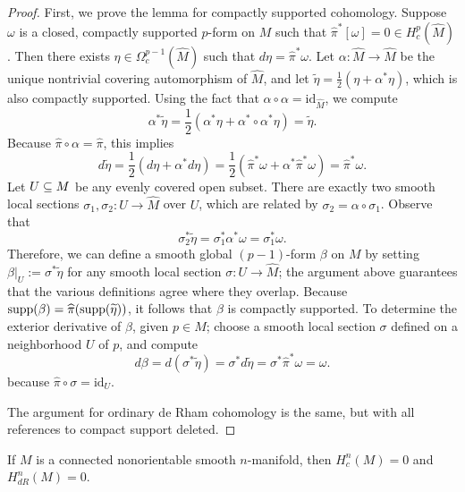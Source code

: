 \begin{proof}
First, we prove the lemma for compactly supported cohomology. Suppose $\omega$ is a closed, compactly supported $p$-form on $M$ such that $\widehat{\pi}^*[\omega]=0\in H^p_c(\widehat{M})$. Then there exists $\eta\in\Omega^{p-1}_c(\widehat{M})$ such that $d\eta=\widehat{\pi}^*\omega$. Let $\alpha:\widehat{M}\to\widehat{M}$ be the unique nontrivial covering automorphism of $\widehat{M}$, and let $\widetilde{\eta}=\frac{1}{2}(\eta+\alpha^*\eta)$, which is also compactly supported. Using the fact that $\alpha\circ\alpha=\mathrm{id}_{\widehat{M}}$, we compute
\[\alpha^*\widetilde{\eta}=\frac{1}{2}(\alpha^*\eta+\alpha^*\circ\alpha^*\eta)=\widetilde{\eta}.\]
Because $\widehat{\pi}\circ\alpha=\widehat{\pi}$, this implies
\[d\widetilde{\eta}=\frac{1}{2}(d\eta+\alpha^*d\eta)=\frac{1}{2}(\widehat{\pi}^*\omega+\alpha^*\widehat{\pi}^*\omega)=\widehat{\pi}^*\omega.\]
Let $U\subseteq M$ be any evenly covered open subset. There are exactly two smooth local sections $\sigma_1,\sigma_2:U\to \widehat{M}$ over $U$, which are related by $\sigma_2=\alpha\circ\sigma_1$. Observe that
\[\sigma_2^*\widetilde{\eta}=\sigma_1^*\alpha^*\omega=\sigma_1^*\omega.\]
Therefore, we can define a smooth global $(p-1)$-form $\beta$ on $M$ by setting $\beta|_U:=\sigma^*\widetilde{\eta}$ for any smooth local section $\sigma:U\to\widehat{M}$; the argument above guarantees that the various definitions agree where they overlap. Because $\mathrm{supp}(\beta)=\widehat{\pi}(\mathrm{supp}(\widetilde{\eta}))$, it follows that $\beta$ is compactly supported. To determine the exterior derivative of $\beta$, given $p\in M$; choose a smooth local section $\sigma$ defined on a neighborhood $U$ of $p$, and compute
\[d\beta=d(\sigma^*\widetilde{\eta})=\sigma^*d\widetilde{\eta}=\sigma^*\widehat{\pi}^*\omega=\omega.\]
because $\widehat{\pi}\circ\sigma=\mathrm{id}_U$.\par
The argument for ordinary de Rham cohomology is the same, but with all references
to compact support deleted.
\end{proof}
\begin{theorem}\label{cohomology n nonorientable}
If $M$ is a connected nonorientable smooth $n$-manifold, then $H^n_c(M)=0$ and $H^n_{dR}(M)=0$.
\end{theorem}
